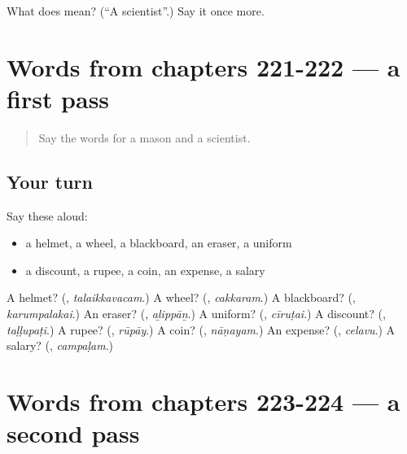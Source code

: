 \begin{tcolorbox}[breakable,colback=teal!4,colframe=teal!35!black,title={Before you move on}]
What does  mean? (\textquotedblleft{}A scientist\textquotedblright{}.) Say it once more.
\end{tcolorbox}
\section[(dialogue)]{Words from chapters 221-222 — a first pass}

\label{lesson:TA-R224-first-pass-words-from-chapters-221-222}



\begin{quote}
Say the words for a mason and a scientist.
\end{quote}

\subsection*{Your turn}
Say these aloud:

\begin{itemize}
\raggedright
  \item a helmet, a wheel, a blackboard, an eraser, a uniform
  \item a discount, a rupee, a coin, an expense, a salary
\end{itemize}

\begin{tcolorbox}[breakable,colback=teal!4,colframe=teal!35!black,title={Before you move on}]
A helmet? (\textbf{}, \emph{talaikkavacam}.) A wheel? (\textbf{}, \emph{cakkaram}.) A blackboard? (\textbf{}, \emph{karumpalakai}.) An eraser? (\textbf{}, \emph{aḻippāṉ}.) A uniform? (\textbf{}, \emph{cīruṭai}.) A discount? (\textbf{}, \emph{taḷḷupaṭi}.) A rupee? (\textbf{}, \emph{rūpāy}.) A coin? (\textbf{}, \emph{nāṇayam}.) An expense? (\textbf{}, \emph{celavu}.) A salary? (\textbf{}, \emph{campaḷam}.)
\end{tcolorbox}
\section[(dialogue)]{Words from chapters 223-224 — a second pass}

\label{lesson:TA-R224-second-pass-words-from-chapters-223-224}



